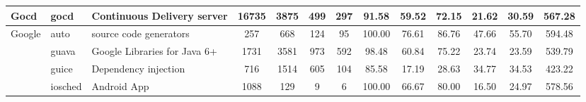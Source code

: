 \begin{table*}[]
{\begin{tabular}{lllcccccccccc}
Gocd                        & gocd                                                          & Continuous Delivery server                                               & 16735          & 3875            & 499                                                              & 297            & 91.58          & 59.52          & 72.15          & 21.62                                                             & 30.59                                                              & 567.28                                               \\ \hline
\multirow{4}{*}{Google}     & auto                                                          & source code generators                                                   & 257            & 668             & 124                                                              & 95             & 100.00         & 76.61          & 86.76          & 47.66                                                             & 55.70                                                              & 594.48                                               \\
                            & guava                                                         & Google Libraries for Java 6+                                             & 1731           & 3581            & 973                                                              & 592            & 98.48          & 60.84          & 75.22          & 23.74                                                             & 23.59                                                              & 539.79                                               \\
                            & guice                                                         & Dependency injection                                                     & 716            & 1514            & 605                                                              & 104            & 85.58          & 17.19          & 28.63          & 34.77                                                             & 34.53                                                              & 423.22                                               \\
                            & iosched                                                       & Android App                                                              & 1088           & 129             & 9                                                                & 6              & 100.00         & 66.67          & 80.00          & 16.50                                                             & 24.97                                                              & 578.56                                               \\ \hline

\end{tabular}}
\end{table*}
